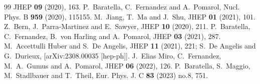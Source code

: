 \documentclass[prl,twocolumn,twoside,preprintnumbers,superscriptaddress, nofootinbib]{revtex4-2}
\begin{document}
\begin{thebibliography}{99}
JHEP \textbf{09} (2020), 163.
%
P.~Baratella, C.~Fernandez and A.~Pomarol,
Nucl. Phys. B \textbf{959} (2020), 115155.
%
M.~Jiang, T.~Ma and J.~Shu,
JHEP \textbf{01} (2021), 101.
%
Z.~Bern, J.~Parra-Martinez and E.~Sawyer,
JHEP \textbf{10} (2020), 211.
%
P.~Baratella, C.~Fernandez, B.~von Harling and A.~Pomarol,
JHEP \textbf{03} (2021), 287.
%
M.~Accettulli Huber and S.~De Angelis,
JHEP \textbf{11} (2021), 221;
%
S.~De Angelis and G.~Durieux,
[arXiv:2308.00035 [hep-ph]].
%
J.~Elias Miro, C.~Fernandez, M.~A.~Gumus and A.~Pomarol,
JHEP \textbf{06} (2022), 126.
%
P.~Baratella, S.~Maggio, M.~Stadlbauer and T.~Theil,
Eur. Phys. J. C \textbf{83} (2023) no.8, 751.
%

\end{thebibliography}
\end{document}
